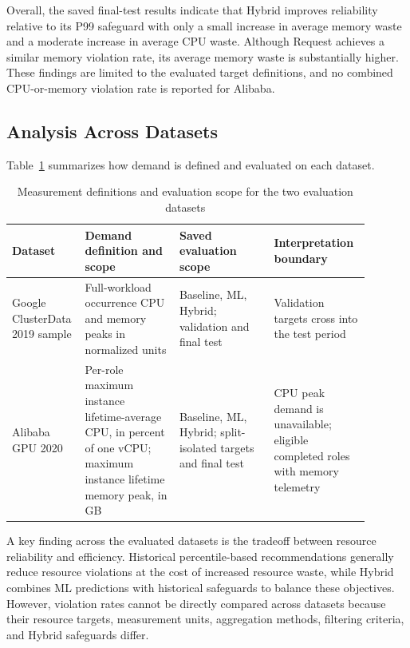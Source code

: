 \documentclass{IEEEtran}
\begin{document}
Overall, the saved final-test results indicate that Hybrid improves reliability relative to its P99 safeguard with only a small increase in average memory waste and a moderate increase in average CPU waste. Although Request achieves a similar memory violation rate, its average memory waste is substantially higher. These findings are limited to the evaluated target definitions, and no combined CPU-or-memory violation rate is reported for Alibaba.

\subsection{Analysis Across Datasets}\label{sec:7.4}

Table~\ref{tab:7.4} summarizes how demand is defined and evaluated on each dataset.

\begin{table}[!t]
\centering
\footnotesize
\caption{Measurement definitions and evaluation scope for the two evaluation datasets}\label{tab:7.4}
\begin{tabular}{>{\raggedright\arraybackslash}p{0.119\linewidth}>{\raggedright\arraybackslash}p{0.258\linewidth}>{\raggedright\arraybackslash}p{0.254\linewidth}>{\raggedright\arraybackslash}p{0.258\linewidth}}
\hline
\textbf{Dataset} & \textbf{Demand definition and scope} & \textbf{Saved evaluation scope} & \textbf{Interpretation boundary} \\ \hline
Google ClusterData 2019 sample & Full-workload occurrence CPU and memory peaks in normalized units & Baseline, ML, Hybrid; validation and final test & Validation targets cross into the test period \\
Alibaba GPU 2020 & Per-role maximum instance lifetime-average CPU, in percent of one vCPU; maximum instance lifetime memory peak, in GB & Baseline, ML, Hybrid; split-isolated targets and final test & CPU peak demand is unavailable; eligible completed roles with memory telemetry \\
\hline
\end{tabular}
\end{table}

A key finding across the evaluated datasets is the tradeoff between resource reliability and efficiency. Historical percentile-based recommendations generally reduce resource violations at the cost of increased resource waste, while Hybrid combines ML predictions with historical safeguards to balance these objectives. However, violation rates cannot be directly compared across datasets because their resource targets, measurement units, aggregation methods, filtering criteria, and Hybrid safeguards differ.
\end{document}
